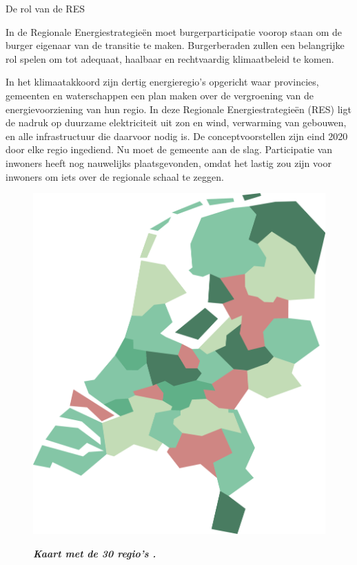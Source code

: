 \begin{voorstel}{De rol van de RES}


\begin{samenvatting}
In de Regionale Energiestrategieën moet burgerparticipatie voorop staan om de burger eigenaar van de transitie te maken. Burgerberaden zullen een belangrijke rol spelen om tot adequaat, haalbaar en rechtvaardig klimaatbeleid te komen.
\end{samenvatting}

\begin{multicols*}{2}

\begin{uitdaging}
In het klimaatakkoord zijn dertig energieregio’s opgericht waar provincies, gemeenten en waterschappen een plan maken over de vergroening van de energievoorziening van hun regio. In deze Regionale Energiestrategieën (RES) ligt de nadruk op duurzame elektriciteit uit zon en wind, verwarming van gebouwen, en alle infrastructuur die daarvoor nodig is. De conceptvoorstellen zijn eind 2020 door elke regio ingediend. Nu moet de gemeente aan de slag. Participatie van inwoners heeft nog nauwelijks plaatsgevonden, omdat het lastig zou zijn voor inwoners om iets over de regionale schaal te zeggen.
\end{uitdaging}

\begin{overwegingen}

\begin{figure}[H]
	\begin{center}
		\includegraphics[width=.8\columnwidth]{img/energie/rol-van-de-res-kaart}
	\end{center}
	\textbf{\textit{Kaart met de 30 regio's \parencite{nationaal_programma_res_handreiking_2019}.}}
\end{figure}


\end{overwegingen}
\end{multicols*}
\end{voorstel}
